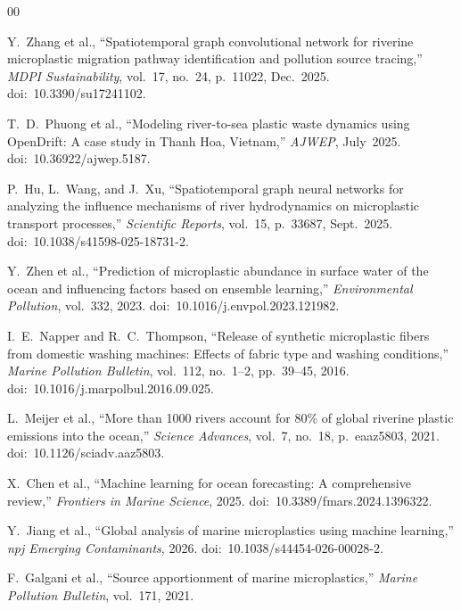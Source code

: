 \documentclass[conference]{IEEEtran}
\begin{document}
\begin{thebibliography}{00}


Y.~Zhang et al., ``Spatiotemporal graph convolutional network for riverine microplastic migration pathway identification and pollution source tracing,'' \textit{MDPI Sustainability}, vol.~17, no.~24, p.~11022, Dec.~2025. doi:~10.3390/su17241102.

T.~D.~Phuong et al., ``Modeling river-to-sea plastic waste dynamics using OpenDrift: A case study in Thanh Hoa, Vietnam,'' \textit{AJWEP}, July~2025. doi:~10.36922/ajwep.5187.

P.~Hu, L.~Wang, and J.~Xu, ``Spatiotemporal graph neural networks for analyzing the influence mechanisms of river hydrodynamics on microplastic transport processes,'' \textit{Scientific Reports}, vol.~15, p.~33687, Sept.~2025. doi:~10.1038/s41598-025-18731-2.

Y.~Zhen et al., ``Prediction of microplastic abundance in surface water of the ocean and influencing factors based on ensemble learning,'' \textit{Environmental Pollution}, vol.~332, 2023. doi:~10.1016/j.envpol.2023.121982.

I.~E.~Napper and R.~C.~Thompson, ``Release of synthetic microplastic fibers from domestic washing machines: Effects of fabric type and washing conditions,'' \textit{Marine Pollution Bulletin}, vol.~112, no.~1--2, pp.~39--45, 2016. doi:~10.1016/j.marpolbul.2016.09.025.

L.~Meijer et al., ``More than 1000 rivers account for 80\% of global riverine plastic emissions into the ocean,'' \textit{Science Advances}, vol.~7, no.~18, p.~eaaz5803, 2021. doi:~10.1126/sciadv.aaz5803.

X.~Chen et al., ``Machine learning for ocean forecasting: A comprehensive review,'' \textit{Frontiers in Marine Science}, 2025. doi:~10.3389/fmars.2024.1396322.

Y.~Jiang et al., ``Global analysis of marine microplastics using machine learning,'' \textit{npj Emerging Contaminants}, 2026. doi:~10.1038/s44454-026-00028-2.

F.~Galgani et al., ``Source apportionment of marine microplastics,'' \textit{Marine Pollution Bulletin}, vol.~171, 2021.


\end{thebibliography}
\end{document}
